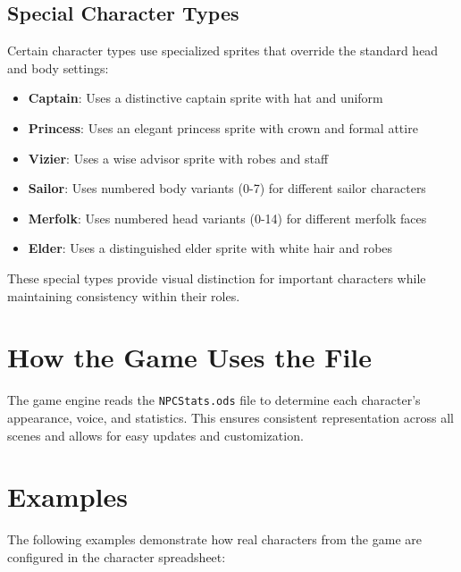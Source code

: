 \documentclass[11pt,letterpaper,oldstylefigures]{memoir}
\begin{document}
\subsection{Special Character Types}

Certain character types use specialized sprites that override the standard head and body settings:

\begin{itemize}
\item \textbf{Captain}: Uses a distinctive captain sprite with hat and uniform
\item \textbf{Princess}: Uses an elegant princess sprite with crown and formal attire
\item \textbf{Vizier}: Uses a wise advisor sprite with robes and staff
\item \textbf{Sailor}: Uses numbered body variants (0-7) for different sailor characters
\item \textbf{Merfolk}: Uses numbered head variants (0-14) for different merfolk faces
\item \textbf{Elder}: Uses a distinguished elder sprite with white hair and robes
\end{itemize}

These special types provide visual distinction for important characters while maintaining consistency within their roles.

\section{How the Game Uses the File}
The game engine reads the \texttt{NPCStats.ods} file to determine each character's appearance, voice, and statistics. This ensures consistent representation across all scenes and allows for easy updates and customization.

\section{Examples}

The following examples demonstrate how real characters from the game are configured in the character spreadsheet:
\end{document}
